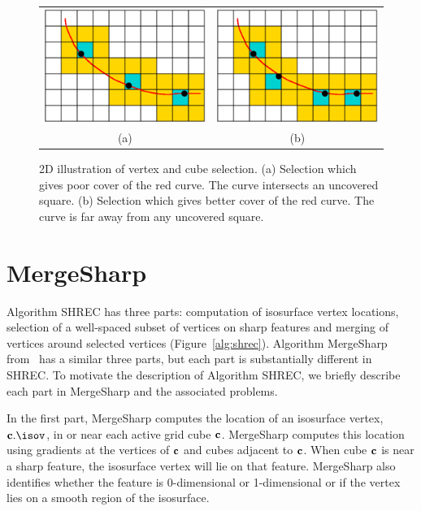 \begin{figure}[t]
\centering

\begin{tabular}{cc}
\includegraphics[width=0.4\linewidth]{images/selectA.eps} \qquad &
\qquad
\includegraphics[width=0.4\linewidth]{images/selectB.eps} \\
(a) & (b) 
\end{tabular}

\caption{2D illustration of vertex and cube selection.
(a) Selection which gives poor cover of the red curve.
The curve intersects an uncovered square.
(b) Selection which gives better cover of the red curve.
The curve is far away from any uncovered square.
}
\label{fig:select}
\end{figure}


\section{MergeSharp}
\label{section:mergesharp}

Algorithm SHREC has three parts:
computation of isosurface vertex locations, 
selection of a well-spaced subset of vertices on sharp features
and merging of vertices around selected vertices
(Figure~\ref{alg:shrec}).
Algorithm MergeSharp from~\cite{bw-cisec-13} 
has a similar three parts,
but each part is substantially different in SHREC.
To motivate the description of Algorithm SHREC,
we briefly describe each part in MergeSharp and the associated problems.

In the first part, 
MergeSharp computes the location of an isosurface vertex, $\cb.\isov$,
in or near each active grid cube $\mathbf{c}$.
MergeSharp computes this location using gradients at the vertices of $\mathbf{c}$
and cubes adjacent to $\mathbf{c}$.
When cube $\mathbf{c}$ is near a sharp feature,
the isosurface vertex will lie on that feature.
MergeSharp also identifies whether the feature 
is 0-dimensional or 1-dimensional
or if the vertex lies on a smooth region of the isosurface.


